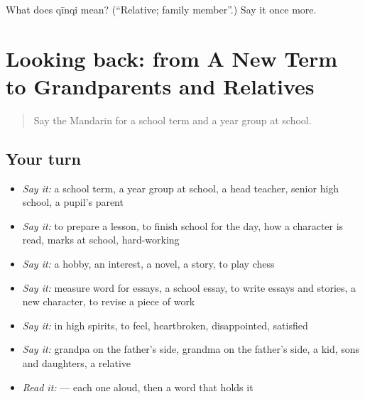\begin{tcolorbox}[breakable,colback=teal!4,colframe=teal!35!black,title={Before you move on}]
What does qīnqi mean? (\textquotedblleft{}Relative; family member\textquotedblright{}.) Say it once more.
\end{tcolorbox}
\section[(dialogue)]{Looking back: from A New Term to Grandparents and Relatives}

\label{lesson:ZH-R253-review-248-253}



\begin{quote}
Say the Mandarin for a school term and a year group at school.
\end{quote}

\subsection*{Your turn}
\begin{itemize}
\raggedright
  \item \emph{Say it:} a school term, a year group at school, a head teacher, senior high school, a pupil's parent
  \item \emph{Say it:} to prepare a lesson, to finish school for the day, how a character is read, marks at school, hard-working
  \item \emph{Say it:} a hobby, an interest, a novel, a story, to play chess
  \item \emph{Say it:} measure word for essays, a school essay, to write essays and stories, a new character, to revise a piece of work
  \item \emph{Say it:} in high spirits, to feel, heartbroken, disappointed, satisfied
  \item \emph{Say it:} grandpa on the father's side, grandma on the father's side, a kid, sons and daughters, a relative
  \item \emph{Read it:}       — each one aloud, then a word that holds it
\end{itemize}


